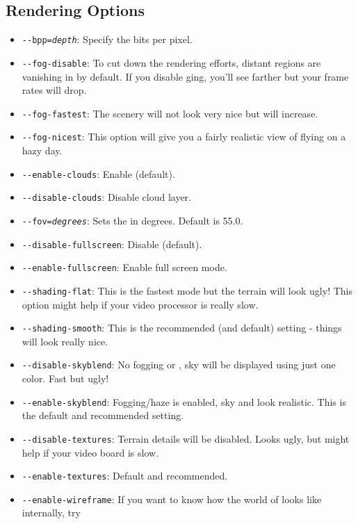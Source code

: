\subsection{Rendering Options}
\begin{itemize}
\item{\texttt{-$ $-bpp={\it depth}}}: Specify the bits per pixel.
\item{\texttt{-$ $-fog-disable}}: To cut down the rendering efforts, distant
  regions are vanishing in  by default. If you disable ging,
  you'll see farther but your frame rates will drop.
\item{\texttt{-$ $-fog-fastest}}: The scenery will not look very nice but
   will increase.
\item{\texttt{-$ $-fog-nicest}}: This option will give you a fairly realistic
  view of flying on a hazy day.
\item{\texttt{-$ $-enable-clouds}}: Enable  (default).
\item{\texttt{-$ $-disable-clouds}}: Disable cloud layer.
\item{\texttt{-$ $-fov={\it degrees}}}: Sets the  in degrees.
Default is 55.0.
\item{\texttt{-$ $-disable-fullscreen}}: Disable  (default).
\item{\texttt{-$ $-enable-fullscreen}}: Enable full screen mode.
\item{\texttt{-$ $-shading-flat}}: This is the fastest mode but the terrain will look ugly!
This option might help if your video processor is really slow.
\item{\texttt{-$ $-shading-smooth}}: This is the recommended (and default) setting - things will look really nice.
\item{\texttt{-$ $-disable-skyblend}}: No fogging or , sky will be displayed
  using just one color. Fast but ugly!
\item{\texttt{-$ $-enable-skyblend}}: Fogging/haze is enabled, sky and  look realistic. This is the default and recommended setting.
\item{\texttt{-$ $-disable-textures}}: Terrain details will be disabled. Looks ugly, but might help if your video board is slow.
\item{\texttt{-$ $-enable-textures}}: Default and recommended.
\item{\texttt{-$ $-enable-wireframe}}: If you want to know how the world of \FlightGear{} looks like internally, try

\end{itemize}

